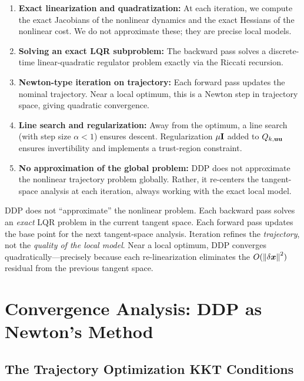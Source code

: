 \begin{enumerate}
\item \textbf{Exact linearization and quadratization:} At each iteration, we compute the exact Jacobians of the
      nonlinear dynamics and the exact Hessians of the nonlinear cost. We do not approximate these; they are
      precise local models.

\item \textbf{Solving an exact LQR subproblem:} The backward pass solves a discrete-time linear-quadratic regulator
      problem exactly via the Riccati recursion.

\item \textbf{Newton-type iteration on trajectory:} Each forward pass updates the nominal trajectory. Near a local
      optimum, this is a Newton step in trajectory space, giving quadratic convergence.

\item \textbf{Line search and regularization:} Away from the optimum, a line search (with step size $\alpha < 1$)
      ensures descent. Regularization $\mu\mathbf{I}$ added to $Q_{k,\mathbf{u}\mathbf{u}}$ ensures invertibility and implements a
      trust-region constraint.

\item \textbf{No approximation of the global problem:} DDP does not approximate the nonlinear trajectory problem globally.
      Rather, it re-centers the tangent-space analysis at each iteration, always working with the exact local model.
\end{enumerate}

\begin{warningbox}
DDP does not ``approximate'' the nonlinear problem. Each backward pass solves an \emph{exact} LQR problem in the
current tangent space. Each forward pass updates the base point for the next tangent-space analysis. Iteration
refines the \emph{trajectory}, not the \emph{quality of the local model}. Near a local optimum, DDP converges
quadratically---precisely because each re-linearization eliminates the $O(\left\lVert \delta\bm{x} \right\rVert^2)$ residual from the
previous tangent space.
\end{warningbox}

\section{Convergence Analysis: DDP as Newton's Method}
\label{sec:ch5:ddp-as-newton}

\subsection{The Trajectory Optimization KKT Conditions}

